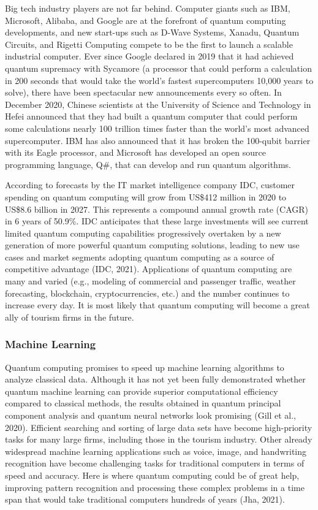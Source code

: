 \documentclass[
  letterpaper,
  DIV=11,
  numbers=noendperiod]{scrreprt}
\begin{document}
Big tech industry players are not far behind. Computer giants such as
IBM, Microsoft, Alibaba, and Google are at the forefront of quantum
computing developments, and new start-ups such as D-Wave Systems,
Xanadu, Quantum Circuits, and Rigetti Computing compete to be the first
to launch a scalable industrial computer. Ever since Google declared in
2019 that it had achieved quantum supremacy with Sycamore (a processor
that could perform a calculation in 200 seconds that would take the
world's fastest supercomputers 10,000 years to solve), there have been
spectacular new announcements every so often. In December 2020, Chinese
scientists at the University of Science and Technology in Hefei
announced that they had built a quantum computer that could perform some
calculations nearly 100 trillion times faster than the world's most
advanced supercomputer. IBM has also announced that it has broken the
100-qubit barrier with its Eagle processor, and Microsoft has developed
an open source programming language, Q\#, that can develop and run
quantum algorithms.

According to forecasts by the IT market intelligence company IDC,
customer spending on quantum computing will grow from US\$412 million in
2020 to US\$8.6 billion in 2027. This represents a compound annual
growth rate (CAGR) in 6 years of 50.9\%. IDC anticipates that these
large investments will see current limited quantum computing
capabilities progressively overtaken by a new generation of more
powerful quantum computing solutions, leading to new use cases and
market segments adopting quantum computing as a source of competitive
advantage (IDC, 2021). Applications of quantum computing are many and
varied (e.g., modeling of commercial and passenger traffic, weather
forecasting, blockchain, cryptocurrencies, etc.) and the number
continues to increase every day. It is most likely that quantum
computing will become a great ally of tourism firms in the future.

\hypertarget{machine-learning-2}{%
\subsubsection{Machine Learning}\label{machine-learning-2}}

Quantum computing promises to speed up machine learning algorithms to
analyze classical data. Although it has not yet been fully demonstrated
whether quantum machine learning can provide superior computational
efficiency compared to classical methods, the results obtained in
quantum principal component analysis and quantum neural networks look
promising (Gill et al., 2020). Efficient searching and sorting of large
data sets have become high-priority tasks for many large firms,
including those in the tourism industry. Other already widespread
machine learning applications such as voice, image, and handwriting
recognition have become challenging tasks for traditional computers in
terms of speed and accuracy. Here is where quantum computing could be of
great help, improving pattern recognition and processing these complex
problems in a time span that would take traditional computers hundreds
of years (Jha, 2021).
\end{document}
